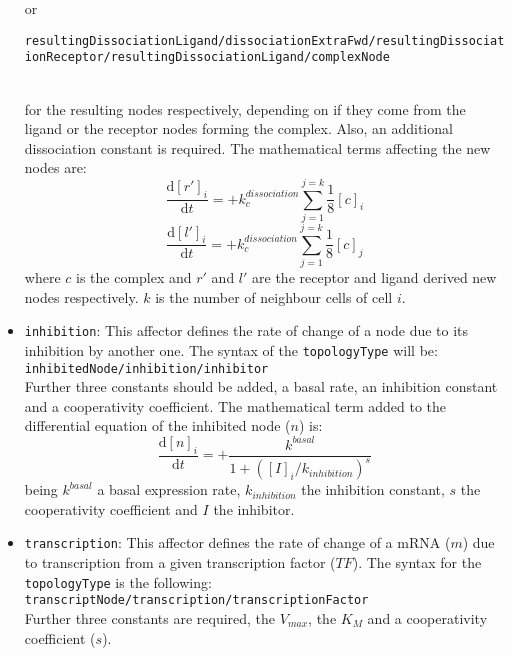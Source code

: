 \documentclass[a4paper, 11pt]{article}
\begin{document}
\begin{itemize}
\begin{tiny}
  \end{tiny}
  or\\
  \begin{tiny}
    \texttt{resultingDissociationLigand/dissociationExtraFwd/resultingDissociationReceptor/resultingDissociationLigand/complexNode}
  \end{tiny}\\[1.5ex]
  for the resulting nodes respectively, depending on if they come from the ligand or the receptor nodes forming the complex.
  Also, an additional dissociation constant is required.
  The mathematical terms affecting the new nodes are:
  \begin{equation}
    \frac{\mathrm{d}[r']_i}{\mathrm{d}t} = + k^{dissociation}_{c} \sum_{j = 1}^{j = k}\frac{1}{8}[c]_i
  \end{equation}
  \begin{equation}
    \frac{\mathrm{d}[l']_i}{\mathrm{d}t} = + k^{dissociation}_{c}\sum_{j = 1}^{j = k}\frac{1}{8}[c]_j
  \end{equation}
  where $c$ is the complex and $r'$ and $l'$ are the receptor and ligand derived new nodes respectively.
  $k$ is the number of neighbour cells of cell $i$.
\item \texttt{inhibition}: 
  This affector defines the rate of change of a node due to its inhibition by another one.
  The syntax of the \texttt{topologyType} will be:\\[1.5ex]
  \texttt{inhibitedNode/inhibition/inhibitor}\\[1.5ex]
  Further three constants should be added, a basal rate, an inhibition constant and a cooperativity coefficient.
  The mathematical term added to the differential equation of the inhibited node ($n$) is:
  \begin{equation}
    \frac{\mathrm{d}[n]_i}{\mathrm{d}t} = + \frac{k^{basal}}{1 + ([I]_i/k_{inhibition})^s}
  \end{equation}
  being $k^{basal}$ a basal expression rate, $k_{inhibition}$ the inhibition constant, $s$ the cooperativity coefficient and $I$ the inhibitor.
\item \texttt{transcription}:
  This affector defines the rate of change of a mRNA ($m$) due to transcription from a given transcription factor ($TF$).
  The syntax for the \texttt{topologyType} is the following:\\[1.5ex]
  \texttt{transcriptNode/transcription/transcriptionFactor}\\[1.5ex]
  Further three constants are required, the $V_{max}$, the $K_M$ and a cooperativity coefficient ($s$).

\end{itemize}
\end{document}
